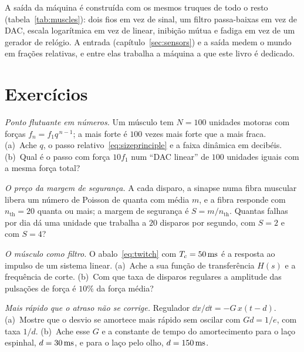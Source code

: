 A saída da máquina é construída com os mesmos truques de todo o resto (tabela~\ref{tab:muscles}): dois fios em vez de sinal, um filtro passa-baixas em vez de DAC, escala logarítmica em vez de linear, inibição mútua e fadiga em vez de um gerador de relógio. A entrada (capítulo~\ref{sec:sensors}) e a saída medem o mundo em frações relativas, e entre elas trabalha a máquina a que este livro é dedicado.

\section{Exercícios}

\begin{exercise}[\lvlA]
\label{ex:13:1}
\emph{Ponto flutuante em números.} Um músculo tem $N=100$ unidades motoras com forças $f_n=f_1q^{\,n-1}$; a mais forte é $100$ vezes mais forte que a mais fraca. (a)~Ache $q$, o passo relativo~\eqref{eq:sizeprinciple} e a faixa dinâmica em decibéis. (b)~Qual é o passo com força $10f_1$ num ``DAC linear'' de $100$ unidades iguais com a mesma força total?
\end{exercise}

\begin{exercise}[\lvlA]
\label{ex:13:2}
\emph{O preço da margem de segurança.} A cada disparo, a sinapse numa fibra muscular libera um número de Poisson de quanta com média $m$, e a fibra responde com $n_{\text{th}}=20$ quanta ou mais; a margem de segurança é $S=m/n_{\text{th}}$. Quantas falhas por dia dá uma unidade que trabalha a $20$ disparos por segundo, com $S=2$ e com $S=4$?
\end{exercise}

\begin{exercise}[\lvlB]
\label{ex:13:3}
\emph{O músculo como filtro.} O abalo~\eqref{eq:twitch} com $T_c=50\,\text{ms}$ é a resposta ao impulso de um sistema linear. (a)~Ache a sua função de transferência $H(s)$ e a frequência de corte. (b)~Com que taxa de disparos regulares a amplitude das pulsações de força é $10\%$ da força média?
\end{exercise}

\begin{exercise}[\lvlB]
\label{ex:13:4}
\emph{Mais rápido que o atraso não se corrige.} Regulador $\dd x/\dd t=-G\,x(t-d)$. (a)~Mostre que o desvio se amortece mais rápido sem oscilar com $Gd=1/e$, com taxa $1/d$. (b)~Ache esse $G$ e a constante de tempo do amortecimento para o laço espinhal, $d=30\,\text{ms}$, e para o laço pelo olho, $d=150\,\text{ms}$.
\end{exercise}

